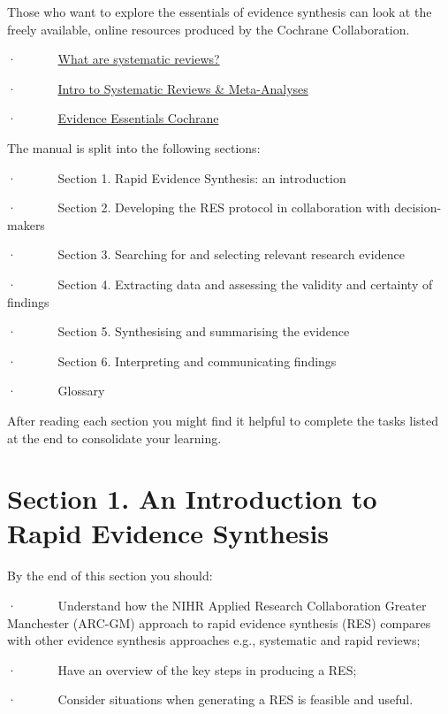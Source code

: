\documentclass[
  letterpaper,
  DIV=11,
  numbers=noendperiod]{scrreprt}
\begin{document}
Those who want to explore the essentials of evidence synthesis can look
at the freely available, online resources produced by the Cochrane
Collaboration.

·~~~~~~ \href{https://www.youtube.com/watch?v=egJlW4vkb1Y}{What are
systematic reviews?}

·~~~~~~
\href{https://www.youtube.com/watch?v=WB9pbHqUs5c&list=PLgp17bk2nACMassfBMJRbfSSvpTfMgLxu&index=5}{Intro
to Systematic Reviews \& Meta-Analyses}

·~~~~~~
\href{https://www.cochrane.org/learn/courses-and-resources/evidence-essentials}{Evidence
Essentials \textbar{} Cochrane}

The manual is split into the following sections:

·~~~~~~ Section 1. Rapid Evidence Synthesis: an introduction

·~~~~~~ Section 2. Developing the RES protocol in collaboration with
decision-makers

·~~~~~~ Section 3. Searching for and selecting relevant research
evidence

·~~~~~~ Section 4. Extracting data and assessing the validity and
certainty of findings

·~~~~~~ Section 5. Synthesising and summarising the evidence

·~~~~~~ Section 6. Interpreting and communicating findings

·~~~~~~ Glossary

After reading each section you might find it helpful to complete the
tasks listed at the end to consolidate your learning.


\chapter{Section 1. An Introduction to Rapid Evidence
Synthesis}\label{section-1.-an-introduction-to-rapid-evidence-synthesis}

By the end of this section you should:

·~~~~~~ Understand how the NIHR Applied Research Collaboration Greater
Manchester (ARC-GM) approach to rapid evidence synthesis (RES) compares
with other evidence synthesis approaches e.g., systematic and rapid
reviews;

·~~~~~~ Have an overview of the key steps in producing a RES;

·~~~~~~ Consider situations when generating a RES is feasible and
useful.
\end{document}
